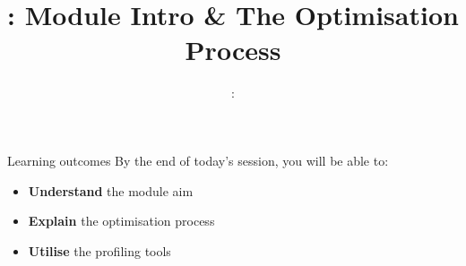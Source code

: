 \usepackage{../../beamerthemeFalmouthGamesAcademy}
\usepackage{multimedia}
\graphicspath{ {../../} }


\usepackage[normalem]{ulem}
\usepackage{wasysym}

\usepackage{pdfpages}

\usetikzlibrary{arrows,automata}




\title{\sessionnumber: Module Intro \& The Optimisation Process}
\subtitle{\modulecode: \moduletitle}

\frame{\titlepage} 

\begin{frame}{Learning outcomes}
	By the end of today's session, you will be able to:
	\begin{itemize}
		\item \textbf{Understand} the module aim
		\item \textbf{Explain} the optimisation process
		\item \textbf{Utilise} the profiling tools
	\end{itemize}
\end{frame}









